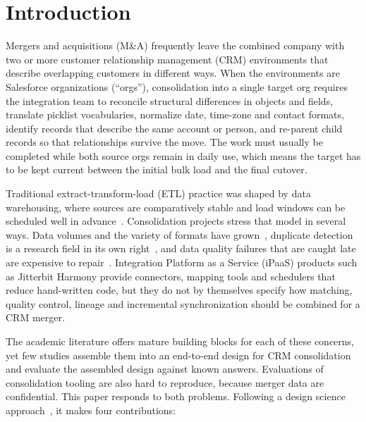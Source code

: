 \section{Introduction}\label{sec:1}

Mergers and acquisitions (M\&A) frequently leave the combined company with two or more customer relationship management (CRM) environments that describe overlapping customers in different ways. When the environments are Salesforce organizations (``orgs''), consolidation into a single target org requires the integration team to reconcile structural differences in objects and fields, translate picklist vocabularies, normalize date, time-zone and contact formats, identify records that describe the same account or person, and re-parent child records so that relationships survive the move. The work must usually be completed while both source orgs remain in daily use, which means the target has to be kept current between the initial bulk load and the final cutover.

Traditional extract-transform-load (ETL) practice was shaped by data warehousing, where sources are comparatively stable and load windows can be scheduled well in advance~\cite{kimball2004,vassiliadis2009}. Consolidation projects stress that model in several ways. Data volumes and the variety of formats have grown~\cite{saggi2018,singh2015}, duplicate detection is a research field in its own right~\cite{christen2012book,elmagarmid2007}, and data quality failures that are caught late are expensive to repair~\cite{batini2009}. Integration Platform as a Service (iPaaS) products such as Jitterbit Harmony provide connectors, mapping tools and schedulers that reduce hand-written code, but they do not by themselves specify how matching, quality control, lineage and incremental synchronization should be combined for a CRM merger.

The academic literature offers mature building blocks for each of these concerns, yet few studies assemble them into an end-to-end design for CRM consolidation and evaluate the assembled design against known answers. Evaluations of consolidation tooling are also hard to reproduce, because merger data are confidential. This paper responds to both problems. Following a design science approach~\cite{hevner2004,peffers2007}, it makes four contributions:

